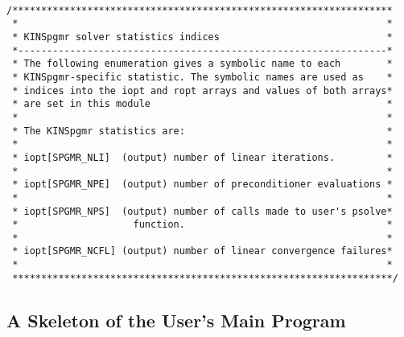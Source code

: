 \documentclass[11pt]{article}
\begin{document}
\small
\begin{verbatim}

/******************************************************************
 *                                                                *
 * KINSpgmr solver statistics indices                             *
 *----------------------------------------------------------------*
 * The following enumeration gives a symbolic name to each        *
 * KINSpgmr-specific statistic. The symbolic names are used as    *
 * indices into the iopt and ropt arrays and values of both arrays*
 * are set in this module                                         *
 *                                                                *
 * The KINSpgmr statistics are:                                   *
 *                                                                *
 * iopt[SPGMR_NLI]  (output) number of linear iterations.         *
 *                                                                *
 * iopt[SPGMR_NPE]  (output) number of preconditioner evaluations *
 *                                                                *
 * iopt[SPGMR_NPS]  (output) number of calls made to user's psolve*
 *                    function.                                   *
 *                                                                *
 * iopt[SPGMR_NCFL] (output) number of linear convergence failures*
 *                                                                *
 ******************************************************************/
\end{verbatim}
\normalsize

\normalsize
\subsection{A Skeleton of the User's Main Program}
\end{document}
